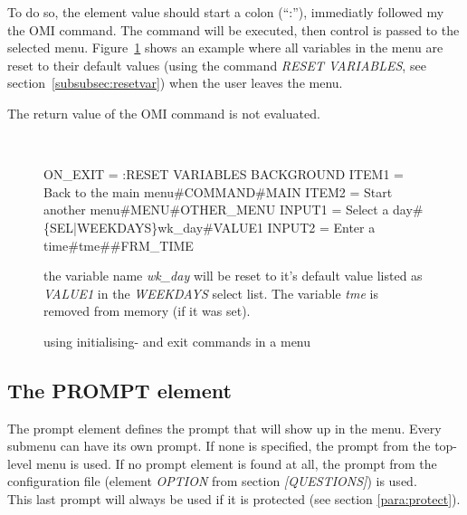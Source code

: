 \documentclass[a4paper]{book}
\renewcommand{\indent}{\hspace*{5mm}}
\begin{document}
To do so, the element value should start a colon (``:''), immediatly followed my the OMI command.
The command will be executed, then control is passed to the selected menu. Figure~\ref{fig:iecmds}
shows an example where all variables in the menu are reset to their default values (using the
command \textsl{RESET VARIABLES}, see section~\ref{subsubsec:resetvar}) when the user leaves the
menu.

The return value of the OMI command is not evaluated.

\begin{figure}[ht]
\begin{minipage}[t]{\textwidth}
\hrulefill \\
\begin{ttfamily}\begin{small}
 \newline
\indent ON{\_}EXIT = :RESET VARIABLES BACKGROUND \newline
\indent ITEM1  = Back to the main menu{\#}COMMAND{\#}MAIN \newline
\indent ITEM2  = Start another menu{\#}MENU{\#}OTHER{\_}MENU \newline
\indent INPUT1 = Select a day\#\{SEL|WEEKDAYS\}wk\_day\#VALUE1 \newline
\indent INPUT2 = Enter a time\#tme\#\#FRM\_TIME
\end{small}\end{ttfamily}
\noindent  the variable name \textit{wk\_day} will be reset to it's default value listed as \textit{VALUE1}
in the \textit{WEEKDAYS} select list. The variable \textit{tme} is removed from memory (if it was
set).
\caption{using initialising- and exit commands in a menu}\label{fig:iecmds}
\hrulefill
\end{minipage}
\end{figure}

\subsection{The PROMPT element}
\label{subsubsec:mylabel23}

The prompt element defines the prompt that 
will show up in the menu. Every submenu can have its own prompt. If none is 
specified, the prompt from the top-level menu is used. If no prompt element 
is found at all, the prompt from the configuration file (element \textsl{OPTION} from 
section \textsl{[QUESTIONS]}) is used. \\
This last prompt will always be used if it is protected (see section \ref{para:protect}).
\end{document}
